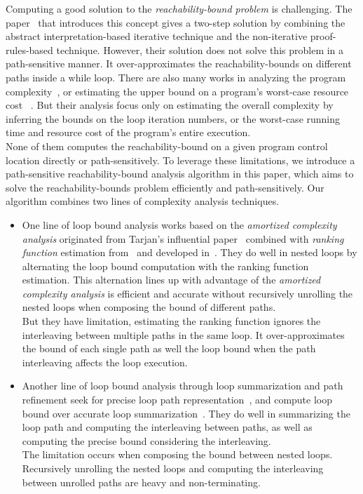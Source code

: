 Computing a good solution to the \emph{reachability-bound problem} is challenging.
The paper~\cite{GulwaniZ10} that introduces this concept
gives a two-step solution by combining the abstract interpretation-based iterative technique
and the non-iterative proof-rules-based technique.
However, their solution
does not solve this problem in a path-sensitive manner.
It over-approximates the reachability-bounds on different paths inside a while loop.
There are also many works in analyzing the program complexity~\cite{GustafssonEL05,HumenbergerJK18},
or estimating the upper bound on a program's worst-case resource cost
~\cite{BrockschmidtEFFG16,AlbertAGP08,AliasDFG10,Flores-MontoyaH14}.
But their analysis
focus only on estimating 
the overall complexity 
by inferring the bounds on the loop iteration numbers,
or the worst-case running time and resource cost of the program's entire execution.
\\
None of them computes the reachability-bound on a given program control location directly or path-sensitively.
To leverage these limitations,
we introduce a path-sensitive reachability-bound analysis algorithm in this paper, which aims to solve 
the reachability-bounds problem efficiently and path-sensitively.
Our algorithm combines two lines of complexity analysis techniques.
\begin{itemize}
  \item One line of loop bound analysis works based on the \emph{amortized complexity analysis} originated from Tarjan's influential paper~\cite{PotechinP17} combined with \emph{ranking function} estimation from~\cite{BradleyMS05} and developed in~\cite{ZulegerGSV11,SinnZV14,SinnZV17,LuCT21,AliasDFG10}.
  They do well in nested loops by alternating the loop bound computation with the ranking function estimation. This alternation lines up with advantage of the \emph{amortized complexity analysis} is efficient and accurate without recursively unrolling the nested loops when composing the bound of different paths.
  \\
  But they have limitation, estimating the ranking function ignores the interleaving between multiple paths in the same loop.
  It over-approximates the bound of each single path as well the loop bound when the path interleaving affects the loop execution.
  \item 
  Another line of loop bound analysis through loop summarization and path refinement seek for precise loop path representation~\cite{ManoliosV06,BalakrishnanSIG09,SharmaDDA11,Flores-MontoyaH14,HumenbergerJK18,CyphertBKR19}, and compute loop bound over accurate loop summarization~\cite{GulwaniJK09,ZulegerGSV11}.
  They do well in summarizing the loop path and computing the interleaving between paths, as well as computing the precise bound considering the interleaving.
  \\
  The limitation occurs when composing the bound between nested loops. Recursively unrolling the nested loops and computing the interleaving between unrolled paths are heavy and non-terminating.
\end{itemize}

